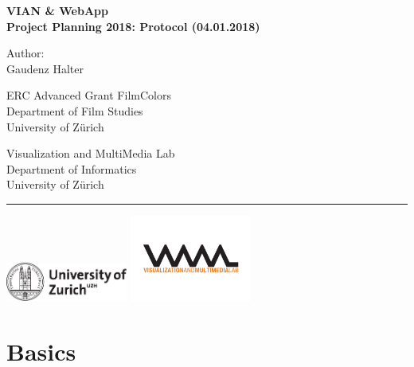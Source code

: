 \documentclass[11pt, a4paper,oneside,chapterprefix=false]{scrbook}
\begin{document}
\frontmatter
\begin{titlepage}
	\setlength{\parindent}{0cm}
	\addtolength{\textheight}{1.0cm}

	\vspace{0.5cm}
	\Huge
	{\textbf \textsf{VIAN \& WebApp\\ \huge Project Planning 2018: Protocol (04.01.2018)}}


	
	\large
	Author:\\
	Gaudenz Halter\\
	
	\vfill\vfill\vfill
	\vfill
	
	

	\vfill \vfill \vfill
	\begin{minipage}[b]{0.5\textwidth}
	ERC Advanced Grant FilmColors\\
	Department of Film Studies \\
	University of Z{\"u}rich
	\end{minipage}
	\begin{minipage}[b]{0.5\textwidth} \raggedleft
	Visualization and MultiMedia Lab \\
	Department of Informatics \\
	University of Z{\"u}rich
	\end{minipage}

	\vfill
	\hrule
	\vspace{0.5cm}
	\includegraphics*[width=0.3\textwidth]{figures/uzh_logo} \hfill
	\includegraphics*[width=0.3\textwidth]{figures/vmml_logo}
\end{titlepage}


\section{Basics} \label{chp:introduction}
\end{document}
